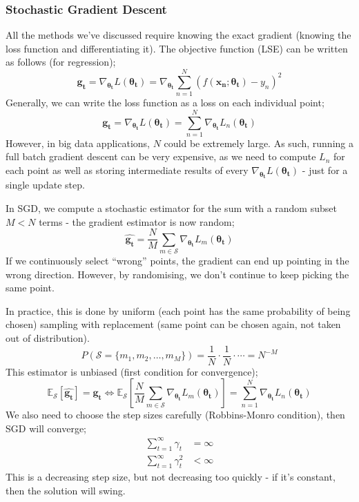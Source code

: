 \documentclass[a4paper, 12pt]{article}
\newcommand{\summation}[2]{\sum\limits_{#1}^{#2}}
\newcommand{\mat}[1]{\boldsymbol{#1}}
\renewcommand{\vec}[1]{\boldsymbol{#1}}
\begin{document}
            \subsubsection*{Stochastic Gradient Descent}
                All the methods we've discussed require knowing the exact gradient (knowing the loss function and differentiating it).
                The objective function (LSE) can be written as follows (for regression);
                $$\mat{g_t} = \nabla_{\mat{\theta_t}}L(\mat{\theta_t}) = \nabla_{\mat{\theta_t}} \summation{n = 1}{N} (f(\vec{x_n}; \mat{\theta_t}) - y_n)^2$$
                Generally, we can write the loss function as a loss on each individual point;
                $$\mat{g_t} = \nabla_{\mat{\theta_t}}L(\mat{\theta_t}) = \summation{n = 1}{N} \nabla_{\mat{\theta_t}} L_n(\mat{\theta_t})$$
                However, in big data applications, $N$ could be extremely large.
                As such, running a full batch gradient descent can be very expensive, as we need to compute $L_n$ for each point as well as storing intermediate results of every $\nabla_{\mat{\theta_t}}L(\mat{\theta_t})$ - just for a single update step.
                \medskip

                In SGD, we compute a stochastic estimator for the sum with a random subset $M < N$ terms - the gradient estimator is now random;
                $$\hat{\mat{g_t}} = \frac{N}{M} \summation{m \in \mathcal{S}}{} \nabla_{\mat{\theta_t}} L_m(\mat{\theta_t})$$
                If we continuously select ``wrong'' points, the gradient can end up pointing in the wrong direction.
                However, by randomising, we don't continue to keep picking the same point.
                \medskip

                In practice, this is done by uniform (each point has the same probability of being chosen) sampling with replacement (same point can be chosen again, not taken out of distribution).
                $$P(\mathcal{S} = \{m_1, m_2, \dots, m_M\}) = \frac{1}{N} \cdot \frac{1}{N} \cdot \cdots = N^{-M}$$
                This estimator is unbiased (first condition for convergence);
                $$\mathbb{E}_\mathcal{S}[\hat{\mat{g_t}}] = \mat{g_t} \Leftrightarrow \mathbb{E}_\mathcal{S}\left[\frac{N}{M} \summation{m \in \mathcal{S}}{} \nabla_{\mat{\theta_t}} L_m(\mat{\theta_t})\right] = \summation{n = 1}{N} \nabla_{\mat{\theta_t}} L_n(\mat{\theta_t})$$
                We also need to choose the step sizes carefully (Robbins-Monro condition), then SGD will converge;
                \begin{align*}
                    \summation{t = 1}{\infty} \gamma_t & = \infty \\
                    \summation{t = 1}{\infty} \gamma_t^2 & < \infty
                \end{align*}
                This is a decreasing step size, but not decreasing too quickly - if it's constant, then the solution will swing.
                \medskip
\end{document}
